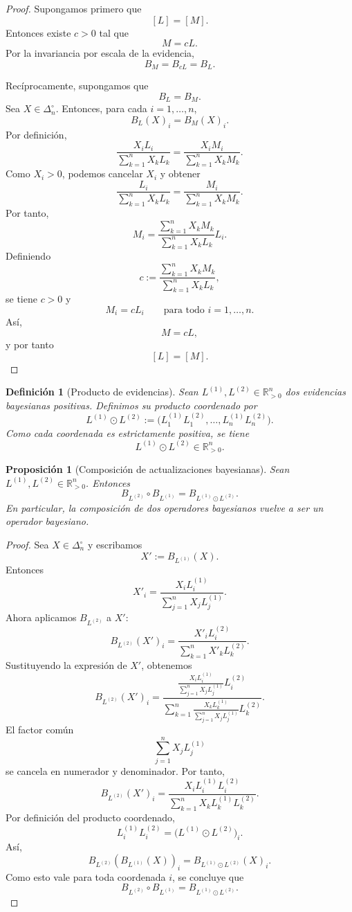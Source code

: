 \documentclass[12pt]{article}
\newtheorem{definicion}{Definición}[section]
\newtheorem{proposicion}{Proposición}[section]
\begin{document}
\begin{proof}
Supongamos primero que
\[
[L]=[M].
\]
Entonces existe \(c>0\) tal que
\[
M=cL.
\]
Por la invariancia por escala de la evidencia,
\[
B_M=B_{cL}=B_L.
\]

Recíprocamente, supongamos que
\[
B_L=B_M.
\]
Sea \(X\in\Delta_n^\circ\). Entonces, para cada \(i=1,\dots,n\),
\[
B_L(X)_i=B_M(X)_i.
\]
Por definición,
\[
\frac{X_iL_i}{\sum_{k=1}^{n}X_kL_k}
=
\frac{X_iM_i}{\sum_{k=1}^{n}X_kM_k}.
\]
Como \(X_i>0\), podemos cancelar \(X_i\) y obtener
\[
\frac{L_i}{\sum_{k=1}^{n}X_kL_k}
=
\frac{M_i}{\sum_{k=1}^{n}X_kM_k}.
\]
Por tanto,
\[
M_i
=
\frac{\sum_{k=1}^{n}X_kM_k}
{\sum_{k=1}^{n}X_kL_k}
L_i.
\]
Definiendo
\[
c
:=
\frac{\sum_{k=1}^{n}X_kM_k}
{\sum_{k=1}^{n}X_kL_k},
\]
se tiene \(c>0\) y
\[
M_i=cL_i
\qquad
\text{para todo } i=1,\dots,n.
\]
Así,
\[
M=cL,
\]
y por tanto
\[
[L]=[M].
\]
\end{proof}



\begin{definicion}[Producto de evidencias]
Sean \(L^{(1)},L^{(2)}\in\mathbb{R}_{>0}^{n}\) dos evidencias bayesianas
positivas. Definimos su producto coordenado por
\[
L^{(1)}\odot L^{(2)}
:=
\bigl(
L^{(1)}_1L^{(2)}_1,\dots,
L^{(1)}_nL^{(2)}_n
\bigr).
\]
Como cada coordenada es estrictamente positiva, se tiene
\[
L^{(1)}\odot L^{(2)}\in\mathbb{R}_{>0}^{n}.
\]
\end{definicion}

\begin{proposicion}[Composición de actualizaciones bayesianas]
Sean \(L^{(1)},L^{(2)}\in\mathbb{R}_{>0}^{n}\). Entonces
\[
B_{L^{(2)}}\circ B_{L^{(1)}}
=
B_{L^{(1)}\odot L^{(2)}}.
\]
En particular, la composición de dos operadores bayesianos vuelve a ser un
operador bayesiano.
\end{proposicion}

\begin{proof}
Sea \(X\in\Delta_n^\circ\) y escribamos
\[
X' := B_{L^{(1)}}(X).
\]
Entonces
\[
X'_i
=
\frac{X_iL^{(1)}_i}
{\sum_{j=1}^{n}X_jL^{(1)}_j}.
\]
Ahora aplicamos \(B_{L^{(2)}}\) a \(X'\):
\[
B_{L^{(2)}}(X')_i
=
\frac{X'_iL^{(2)}_i}
{\sum_{k=1}^{n}X'_kL^{(2)}_k}.
\]
Sustituyendo la expresión de \(X'\), obtenemos
\[
B_{L^{(2)}}(X')_i
=
\frac{
\frac{X_iL^{(1)}_i}{\sum_{j=1}^{n}X_jL^{(1)}_j}
L^{(2)}_i
}{
\sum_{k=1}^{n}
\frac{X_kL^{(1)}_k}{\sum_{j=1}^{n}X_jL^{(1)}_j}
L^{(2)}_k
}.
\]
El factor común
\[
\sum_{j=1}^{n}X_jL^{(1)}_j
\]
se cancela en numerador y denominador. Por tanto,
\[
B_{L^{(2)}}(X')_i
=
\frac{X_iL^{(1)}_iL^{(2)}_i}
{\sum_{k=1}^{n}X_kL^{(1)}_kL^{(2)}_k}.
\]
Por definición del producto coordenado,
\[
L^{(1)}_iL^{(2)}_i
=
\bigl(L^{(1)}\odot L^{(2)}\bigr)_i.
\]
Así,
\[
B_{L^{(2)}}(B_{L^{(1)}}(X))_i
=
B_{L^{(1)}\odot L^{(2)}}(X)_i.
\]
Como esto vale para toda coordenada \(i\), se concluye que
\[
B_{L^{(2)}}\circ B_{L^{(1)}}
=
B_{L^{(1)}\odot L^{(2)}}.
\]
\end{proof}
\end{document}
